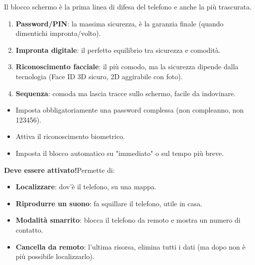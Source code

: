 


Il blocco schermo è la prima linea di difesa del telefono e anche la più trascurata.


\begin{enumerate}
  \item \textbf{Password/PIN}: la massima sicurezza, è la garanzia finale (quando dimentichi impronta/volto).
  \item \textbf{Impronta digitale}: il perfetto equilibrio tra sicurezza e comodità.
  \item \textbf{Riconoscimento facciale}: il più comodo, ma la sicurezza dipende dalla tecnologia (Face ID 3D sicuro, 2D aggirabile con foto).
  \item \textbf{Sequenza}: comoda ma lascia tracce sullo schermo, facile da indovinare.
\end{enumerate}


\begin{itemize}
  \item Imposta obbligatoriamente una password complessa (non compleanno, non 123456).
  \item Attiva il riconoscimento biometrico.
  \item Imposta il blocco automatico su "immediato" o sul tempo più breve.
\end{itemize}


\textbf{Deve essere attivato!}Permette di:

\begin{itemize}
  \item \textbf{Localizzare}: dov'è il telefono, su una mappa.
  \item \textbf{Riprodurre un suono}: fa squillare il telefono, utile in casa.
  \item \textbf{Modalità smarrito}: blocca il telefono da remoto e mostra un numero di contatto.
  \item \textbf{Cancella da remoto}: l'ultima risorsa, elimina tutti i dati (ma dopo non è più possibile localizzarlo).
\end{itemize}


